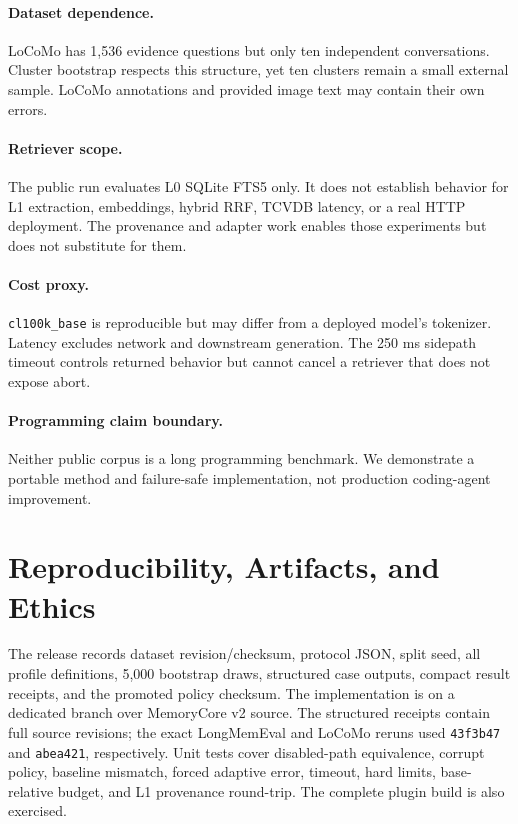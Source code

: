 \documentclass[10pt]{article}
\newcommand{\code}[1]{\texttt{#1}}
\begin{document}
\paragraph{Dataset dependence.}
LoCoMo has 1,536 evidence questions but only ten independent conversations.
Cluster bootstrap respects this structure, yet ten clusters remain a small
external sample. LoCoMo annotations and provided image text may contain their
own errors.

\paragraph{Retriever scope.}
The public run evaluates L0 SQLite FTS5 only. It does not establish behavior for
L1 extraction, embeddings, hybrid RRF, TCVDB latency, or a real HTTP deployment.
The provenance and adapter work enables those experiments but does not substitute
for them.

\paragraph{Cost proxy.}
\code{cl100k\_base} is reproducible but may differ from a deployed model's
tokenizer. Latency excludes network and downstream generation. The 250 ms
sidepath timeout controls returned behavior but cannot cancel a retriever that
does not expose abort.

\paragraph{Programming claim boundary.}
Neither public corpus is a long programming benchmark. We demonstrate a
portable method and failure-safe implementation, not production coding-agent
improvement.

\section{Reproducibility, Artifacts, and Ethics}

The release records dataset revision/checksum, protocol JSON, split seed, all
profile definitions, 5,000 bootstrap draws, structured case outputs, compact
result receipts, and the promoted policy checksum. The implementation is on a
dedicated branch over MemoryCore v2 source. The structured receipts contain
full source revisions; the exact LongMemEval and LoCoMo reruns used
\code{43f3b47} and \code{abea421}, respectively. Unit tests cover disabled-path
equivalence, corrupt policy, baseline mismatch, forced adaptive error, timeout,
hard limits, base-relative budget, and L1 provenance round-trip. The complete
plugin build is also exercised.
\end{document}
